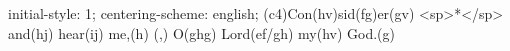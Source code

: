 initial-style: 1;
centering-scheme: english;
(c4)Con(hv)sid(fg)er(gv) <sp>*</sp> and(hj) hear(ij) me,(h) (,) O(ghg) Lord(ef/gh) my(hv) God.(g)
